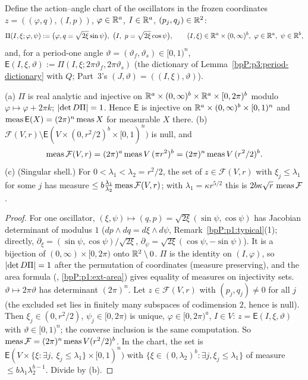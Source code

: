 Define the action--angle chart of the oscillators in the frozen coordinates $z=((\varphi,q),(I,p))$, $\varphi\in\mathbb{R}^a$, $I\in\mathbb{R}^a$, $(p_j,q_j)\in\mathbb{R}^2$:
\[\Pi(I,\xi;\varphi,\psi):=\bigl(\varphi,q=\sqrt{2\xi}\sin\psi\bigr),\ \bigl(I,\ p=\sqrt{2\xi}\cos\psi\bigr),\qquad(I,\xi)\in\R^a\times(0,\infty)^b,\ \varphi\in\R^a,\ \psi\in\R^b,\]
and, for a period-one angle $\vartheta=(\vartheta_f,\vartheta_s)\in[0,1)^n$, $\mathsf E(I,\xi,\vartheta):=\Pi(I,\xi;2\pi\vartheta_f,2\pi\vartheta_s)$ (the dictionary of Lemma~\ref{bpP:p3:period-dictionary} with $Q$; Part~3's $(J,\vartheta)=((I,\xi),\vartheta)$).

\begin{lemma}\label{bpP:p4:disc-measure}
(a) $\Pi$ is real analytic and injective on $\mathbb{R}^a\times(0,\infty)^b\times\mathbb{R}^a\times[0,2\pi)^b$ modulo $\varphi\mapsto\varphi+2\pi k$; $\lvert \det D\Pi\rvert=1$. Hence $\mathsf E$ is injective on $\mathbb{R}^a\times(0,\infty)^b\times[0,1)^n$ and $\operatorname{meas}\mathsf E(X)=(2\pi)^n\operatorname{meas} X$ for measurable $X$ there.
(b) $\mathcal F(V,r)\setminus\mathsf E(V\times(0,r^2/2)^b\times[0,1)^n)$ is null, and
\[\operatorname{meas}\mathcal F(V,r)=(2\pi)^a\operatorname{meas} V\,(\pi r^2)^b=(2\pi)^n\operatorname{meas} V\,(r^2/2)^b .\]
(c) (Singular shell.) For $0<\lambda_1<\lambda_2=r^2/2$, the set of $z\in\mathcal F(V,r)$ with $\xi_j\le\lambda_1$ for some $j$ has measure $\le b\frac{\lambda_1}{\lambda_2}\operatorname{meas}\mathcal F(V,r)$; with $\lambda_1=\kappa r^{5/2}$ this is $2b\kappa\sqrt r\,\operatorname{meas}\mathcal F$.
\end{lemma}
\begin{proof}
\label{stepP:p4:dm-jac}
For one oscillator, $(\xi,\psi)\mapsto(q,p)=\sqrt{2\xi}(\sin\psi,\cos\psi)$ has Jacobian determinant of modulus $1$ ($dp\wedge dq=d\xi\wedge d\psi$, Remark~\ref{bpP:p1:typical}(1); directly, $\partial_\xi=(\sin\psi,\cos\psi)/\sqrt{2\xi}$, $\partial_\psi=\sqrt{2\xi}(\cos\psi,-\sin\psi)$). It is a bijection of $(0,\infty)\times[0,2\pi)$ onto $\mathbb{R}^2\setminus0$. $\Pi$ is the identity on $(I,\varphi)$, so $\lvert \det D\Pi\rvert=1$ after the permutation of coordinates (measure preserving), and the area formula (, \ref{bpP:p1:ext-area}) gives equality of measures on injectivity sets. $\vartheta\mapsto2\pi\vartheta$ has determinant $(2\pi)^n$.
\label{stepP:p4:dm-cell}
Let $z\in\mathcal F(V,r)$ with $(p_j,q_j)\ne0$ for all $j$ (the excluded set lies in finitely many subspaces of codimension $2$, hence is null). Then $\xi_j\in(0,r^2/2)$, $\psi_j\in[0,2\pi)$ is unique, $\varphi\in[0,2\pi)^a$, $I\in V$: $z=\mathsf E(I,\xi,\vartheta)$ with $\vartheta\in[0,1)^n$; the converse inclusion is the same computation. So $\operatorname{meas}\mathcal F=(2\pi)^n\operatorname{meas} V(r^2/2)^b$.
\label{stepP:p4:dm-shell}
In the chart, the set is $\mathsf E(V\times\{\xi:\exists j,\ \xi_j\le\lambda_1\}\times[0,1)^n)$ with $\{\xi\in(0,\lambda_2)^b:\exists j,\xi_j\le\lambda_1\}$ of measure $\le b\lambda_1\lambda_2^{b-1}$. Divide by (b).
\end{proof}

